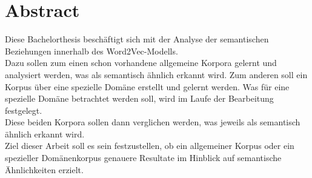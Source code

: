 \documentclass[11pt]{article}
\begin{document}
\section*{Abstract}
Diese Bachelorthesis beschäftigt sich mit der Analyse der semantischen Beziehungen innerhalb des Word2Vec-Modells.
\\Dazu sollen zum einen schon vorhandene allgemeine Korpora gelernt und analysiert werden, was als semantisch ähnlich erkannt wird. Zum anderen soll ein Korpus über eine spezielle Domäne erstellt und gelernt werden. Was für eine spezielle Domäne betrachtet werden soll, wird im Laufe der Bearbeitung festgelegt.
\\Diese beiden Korpora sollen dann verglichen werden, was jeweils als semantisch ähnlich erkannt wird. 
\\Ziel dieser Arbeit soll es sein festzustellen, ob ein allgemeiner Korpus oder ein spezieller Domänenkorpus genauere Resultate im Hinblick auf semantische Ähnlichkeiten erzielt.
\end{document}
